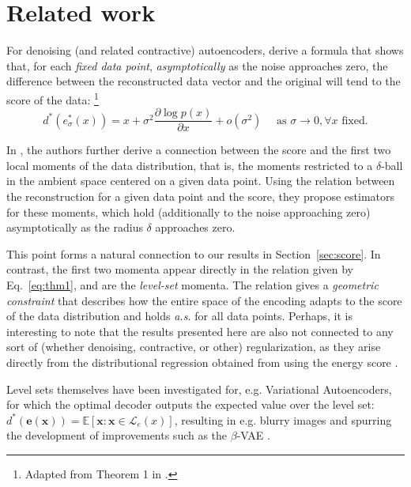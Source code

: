 \section{Related work}
%
\label{sec:related_work}

For denoising (and related contractive) autoencoders, \citet{alain_what_2014} derive a formula that shows that, for each \textit{fixed data point}, \textit{asymptotically} as the noise approaches zero, the difference between the reconstructed data vector and the original will tend to the score of the data:
\footnote{Adapted from Theorem 1 in \citet{alain_what_2014}.}
\begin{equation}
    d^*(e_\sigma^*(x)) = x+\sigma^2 \frac{\partial \log p(x)}{\partial x}+o\left(\sigma^2\right) \quad \text{ as } \sigma \rightarrow 0, \forall x \text{ fixed}.
    \label{eq:bengio_matching}
\end{equation}

In \citet{bengio_implicit_2012}, the authors further derive a connection between the score and the first two local moments of the data distribution, that is, the moments restricted to a $\delta$-ball in the ambient space centered on a given data point. Using the relation between the reconstruction for a given data point and the score, they propose estimators for these moments, which hold (additionally to the noise approaching zero) asymptotically as the radius $\delta$ approaches zero.


This point forms a natural connection to our results in Section~\ref{sec:score}. In contrast, the first two momenta appear directly in the relation given by Eq.~\ref{eq:thm1}, and are the \textit{level-set} momenta. The relation gives a \textit{geometric constraint} that describes how the entire space of the encoding adapts to the score of the data distribution and holds \textit{a.s.} for all data points. Perhaps, it is interesting to note that the results presented here are also not connected to any sort of (whether denoising, contractive, or other) regularization, as they arise directly from the distributional regression obtained from using the energy score \citep{gneiting_strictly_2007}.


Level sets themselves have been investigated for, e.g. Variational Autoencoders, for which the optimal decoder outputs the expected value over the level set: $d^*(\boldsymbol{e(x)})=\mathbb{E}[\boldsymbol{x}: \boldsymbol{x} \in \mathcal{L}_e(x)]$, resulting in e.g. blurry images and spurring the development of improvements such as the $\beta$-VAE \citep{murphy_probabilistic_2023}.



